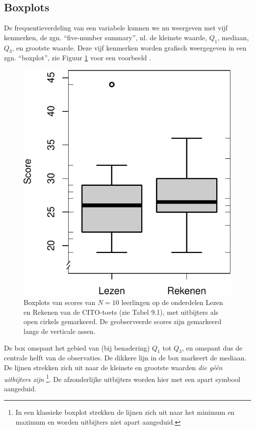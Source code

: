 \documentclass[
]{book}
\begin{document}
\hypertarget{sec:boxplot}{%
\subsection{Boxplots}\label{sec:boxplot}}

De frequentieverdeling van een variabele kunnen we nu weergeven met vijf
kenmerken, de zgn. ``five-number summary'', nl. de kleinste waarde, \(Q_1\),
mediaan, \(Q_3\), en grootste waarde. Deze vijf kenmerken worden grafisch
weergegeven in een zgn. ``boxplot'', zie
Figuur \ref{fig:cito-boxplot} voor een voorbeeld \citep[ §2C]{Tukey77}.

\begin{figure}
\centering
\includegraphics{KMS-NL_files/figure-latex/cito-boxplot-1.pdf}
\caption{\label{fig:cito-boxplot}Boxplots van scores van \(N=10\) leerlingen op de onderdelen Lezen en Rekenen van de CITO-toets (zie Tabel 9.1), met uitbijters als open cirkels gemarkeerd. De geobserveerde scores zijn gemarkeerd langs de verticale assen.}
\end{figure}

De box omspant het gebied van (bij benadering) \(Q_1\) tot \(Q_3\), en
omspant dus de centrale helft van de observaties. De dikkere lijn in de
box markeert de mediaan. De lijnen strekken zich uit naar de kleinste en
grootste waarden \emph{die géén uitbijters zijn} \footnote{In een klassieke boxplot strekken de lijnen zich uit naar het minimum en maximum \citep{Tukey77} en worden uitbijters niet apart aangeduid.}. De afzonderlijke
uitbijters worden hier met een apart symbool aangeduid.
\end{document}
